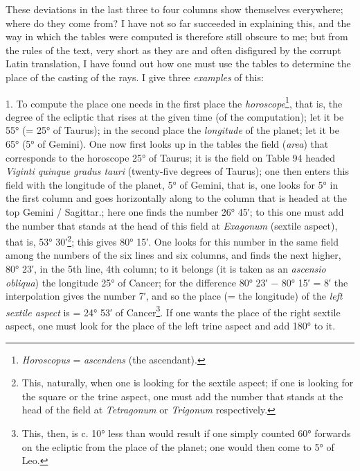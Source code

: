 \documentclass[11pt]{article}
\newcommand{\Pg}[1]{\marginpar{\footnotesize\color{gray}#1}}
\begin{document}
\par These deviations in the last three to four columns show themselves everywhere; where do they come from? I have not so far succeeded in explaining this, and the way in which the tables were computed is therefore still obscure to me; but from the rules of the text, very short as they are and often disfigured by the corrupt Latin translation, I have found out how one must use the tables to determine the place of the casting of the rays. I give three \emph{examples} of this:\par
\par 1. To compute the place one needs in the first place the \emph{horoscope}\footnote{\emph{Horoscopus} = \emph{ascendens} (the ascendant).}, that is, the degree of the ecliptic that rises at the given time (of the computation); let it be 55° (= 25° of Taurus); in the second place the \emph{longitude} of the planet; let it be 65° (5° of Gemini). One now first looks up in the tables the field (\emph{area}) that corresponds to the horoscope 25° of Taurus; it is the field on Table 94 headed \emph{Viginti quinque gradus tauri} (twenty-five degrees of Taurus); one then enters this field with the longitude of the planet, 5° of Gemini, that is, one looks for 5° in the first column and goes horizontally along to the column that is headed at the top Gemini / Sagittar.; here one finds \Pg{101}the number 26° 45′; to this one must add the number that stands at the head of this field at \emph{Exagonum} (sextile aspect), that is, 53° 30′\footnote{This, naturally, when one is looking for the sextile aspect; if one is looking for the square or the trine aspect, one must add the number that stands at the head of the field at \emph{Tetragonum} or \emph{Trigonum} respectively.}; this gives 80° 15′. One looks for this number in the same field among the numbers of the six lines and six columns, and finds the next higher, 80° 23′, in the 5th line, 4th column; to it belongs (it is taken as an \emph{ascensio obliqua}) the longitude 25° of Cancer; for the difference 80° 23′ − 80° 15′ = 8′ the interpolation gives the number 7′, and so the place (= the longitude) of the \emph{left sextile aspect} is = 24° 53′ of Cancer\footnote{This, then, is c. 10° less than would result if one simply counted 60° forwards on the ecliptic from the place of the planet; one would then come to 5° of Leo.}. If one wants the place of the right sextile aspect, one must look for the place of the left trine aspect and add 180° to it.\par
\end{document}
